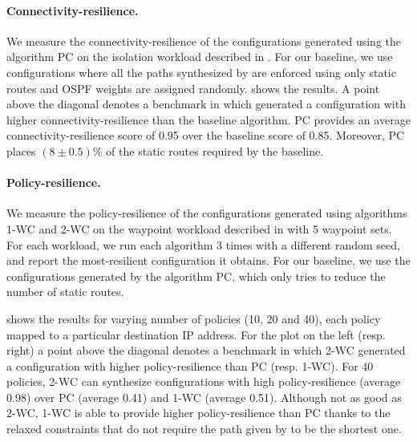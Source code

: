 \paragraph{Connectivity-resilience.}
We measure the connectivity-resilience of the configurations 
generated using the algorithm PC on the isolation workload described in
. 
For our baseline, we use configurations 
where all the paths synthesized by \genesis
are enforced using only static routes and
OSPF weights are assigned randomly.
shows the results. A point above the diagonal 
denotes a benchmark in which \name
generated a configuration with higher connectivity-resilience than
the baseline algorithm.
PC provides an average connectivity-resilience score 
of 0.95 over the baseline score 
of 0.85.
Moreover, PC places
$(8 \pm 0.5)$\% of the static routes required by the baseline. 



\paragraph{Policy-resilience.}
We measure the policy-resilience of the configurations 
generated using algorithms  1-WC and 2-WC on the waypoint workload described in
 with 5 waypoint sets. 
For each workload, we run each algorithm 
3 times with a different random seed, and report the most-resilient configuration it obtains.
For our baseline, we use the configurations generated by the algorithm PC, which
only tries to reduce the number of static routes.

shows the results
for varying number of policies (10, 20 and 40), each policy mapped 
to a particular destination IP address. 
For the plot on the left (resp. right)
a point above the diagonal 
denotes a benchmark in which 2-WC
generated a configuration with higher policy-resilience than
PC (resp. 1-WC).
For 40 policies, 
2-WC can synthesize 
configurations with high policy-resilience
(average 0.98) over PC (average 0.41) and 1-WC (average 0.51). 
Although not as good as 2-WC, 1-WC is able to provide 
higher policy-resilience than
PC thanks to the relaxed constraints that do not require
the path given by \genesis to be the shortest one.

